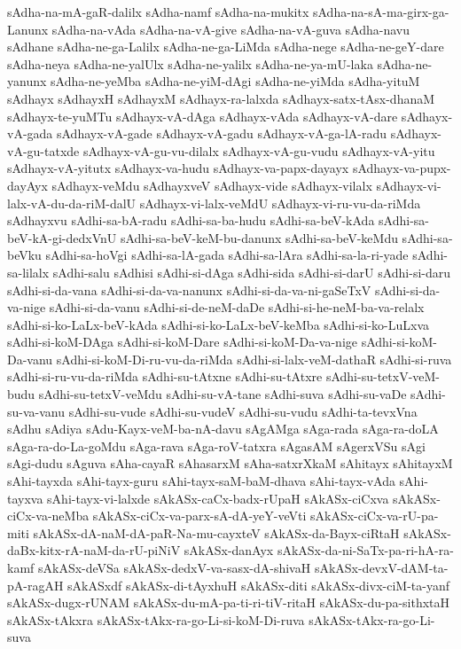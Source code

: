 {sAdha-na-mA-gaR-dalilx
sAdha-namf
sAdha-na-mukitx
sAdha-na-sA-ma-girx-ga-Lanunx
sAdha-na-vAda
sAdha-na-vA-give
sAdha-na-vA-guva
sAdha-navu
sAdhane
sAdha-ne-ga-Lalilx
sAdha-ne-ga-LiMda
sAdha-nege
sAdha-ne-geY-dare
sAdha-neya
sAdha-ne-yalUlx
sAdha-ne-yalilx
sAdha-ne-ya-mU-laka
sAdha-ne-yanunx
sAdha-ne-yeMba
sAdha-ne-yiM-dAgi
sAdha-ne-yiMda
sAdha-yituM
sAdhayx
sAdhayxH
sAdhayxM
sAdhayx-ra-lalxda
sAdhayx-satx-tAsx-dhanaM
sAdhayx-te-yuMTu
sAdhayx-vA-dAga
sAdhayx-vAda
sAdhayx-vA-dare
sAdhayx-vA-gada
sAdhayx-vA-gade
sAdhayx-vA-gadu
sAdhayx-vA-ga-lA-radu
sAdhayx-vA-gu-tatxde
sAdhayx-vA-gu-vu-dilalx
sAdhayx-vA-gu-vudu
sAdhayx-vA-yitu
sAdhayx-vA-yitutx
sAdhayx-va-hudu
sAdhayx-va-papx-dayayx
sAdhayx-va-pupx-dayAyx
sAdhayx-veMdu
sAdhayxveV
sAdhayx-vide
sAdhayx-vilalx
sAdhayx-vi-lalx-vA-du-da-riM-dalU
sAdhayx-vi-lalx-veMdU
sAdhayx-vi-ru-vu-da-riMda
sAdhayxvu
sAdhi-sa-bA-radu
sAdhi-sa-ba-hudu
sAdhi-sa-beV-kAda
sAdhi-sa-beV-kA-gi-dedxVnU
sAdhi-sa-beV-keM-bu-danunx
sAdhi-sa-beV-keMdu
sAdhi-sa-beVku
sAdhi-sa-hoVgi
sAdhi-sa-lA-gada
sAdhi-sa-lAra
sAdhi-sa-la-ri-yade
sAdhi-sa-lilalx
sAdhi-salu
sAdhisi
sAdhi-si-dAga
sAdhi-sida
sAdhi-si-darU
sAdhi-si-daru
sAdhi-si-da-vana
sAdhi-si-da-va-nanunx
sAdhi-si-da-va-ni-gaSeTxV
sAdhi-si-da-va-nige
sAdhi-si-da-vanu
sAdhi-si-de-neM-daDe
sAdhi-si-he-neM-ba-va-relalx
sAdhi-si-ko-LaLx-beV-kAda
sAdhi-si-ko-LaLx-beV-keMba
sAdhi-si-ko-LuLxva
sAdhi-si-koM-DAga
sAdhi-si-koM-Dare
sAdhi-si-koM-Da-va-nige
sAdhi-si-koM-Da-vanu
sAdhi-si-koM-Di-ru-vu-da-riMda
sAdhi-si-lalx-veM-dathaR
sAdhi-si-ruva
sAdhi-si-ru-vu-da-riMda
sAdhi-su-tAtxne
sAdhi-su-tAtxre
sAdhi-su-tetxV-veM-budu
sAdhi-su-tetxV-veMdu
sAdhi-su-vA-tane
sAdhi-suva
sAdhi-su-vaDe
sAdhi-su-va-vanu
sAdhi-su-vude
sAdhi-su-vudeV
sAdhi-su-vudu
sAdhi-ta-tevxVna
sAdhu
sAdiya
sAdu-Kayx-veM-ba-nA-davu
sAgAMga
sAga-rada
sAga-ra-doLA
sAga-ra-do-La-goMdu
sAga-rava
sAga-roV-tatxra
sAgasAM
sAgerxVSu
sAgi
sAgi-dudu
sAguva
sAha-cayaR
sAhasarxM
sAha-satxrXkaM
sAhitayx
sAhitayxM
sAhi-tayxda
sAhi-tayx-guru
sAhi-tayx-saM-baM-dhava
sAhi-tayx-vAda
sAhi-tayxva
sAhi-tayx-vi-lalxde
sAkASx-caCx-badx-rUpaH
sAkASx-ciCxva
sAkASx-ciCx-va-neMba
sAkASx-ciCx-va-parx-sA-dA-yeY-veVti
sAkASx-ciCx-va-rU-pa-miti
sAkASx-dA-naM-dA-paR-Na-mu-cayxteV
sAkASx-da-Bayx-ciRtaH
sAkASx-daBx-kitx-rA-naM-da-rU-piNiV
sAkASx-danAyx
sAkASx-da-ni-SaTx-pa-ri-hA-ra-kamf
sAkASx-deVSa
sAkASx-dedxV-va-sasx-dA-shivaH
sAkASx-devxV-dAM-ta-pA-ragAH
sAkASxdf
sAkASx-di-tAyxhuH
sAkASx-diti
sAkASx-divx-ciM-ta-yanf
sAkASx-dugx-rUNAM
sAkASx-du-mA-pa-ti-ri-tiV-ritaH
sAkASx-du-pa-sithxtaH
sAkASx-tAkxra
sAkASx-tAkx-ra-go-Li-si-koM-Di-ruva
sAkASx-tAkx-ra-go-Li-suva
}
